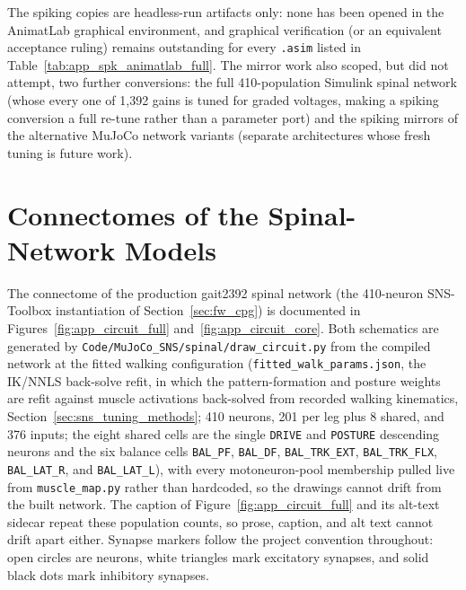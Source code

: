 The spiking copies are headless-run artifacts only: none has been opened in the AnimatLab graphical environment, and graphical verification (or an equivalent acceptance ruling) remains outstanding for every \texttt{.asim} listed in Table~\ref{tab:app_spk_animatlab_full}. The mirror work also scoped, but did not attempt, two further conversions: the full 410-population Simulink spinal network (whose every one of 1,392 gains is tuned for graded voltages, making a spiking conversion a full re-tune rather than a parameter port) and the spiking mirrors of the alternative MuJoCo network variants (separate architectures whose fresh tuning is future work).

\section{Connectomes of the Spinal-Network Models}\label{app:connectomes}

The connectome of the production gait2392 spinal network (the 410-neuron SNS-Toolbox instantiation of Section~\ref{sec:fw_cpg}) is documented in Figures~\ref{fig:app_circuit_full} and~\ref{fig:app_circuit_core}. Both schematics are generated by \texttt{Code/MuJoCo\_SNS/spinal/draw\_circuit.py} from the compiled network at the fitted walking configuration (\texttt{fitted\_walk\_params.json}, the IK/NNLS back-solve refit, in which the pattern-formation and posture weights are refit against muscle activations back-solved from recorded walking kinematics, Section~\ref{sec:sns_tuning_methods}; 410 neurons, 201 per leg plus 8 shared, and 376 inputs; the eight shared cells are the single \texttt{DRIVE} and \texttt{POSTURE} descending neurons and the six balance cells \texttt{BAL\_PF}, \texttt{BAL\_DF}, \texttt{BAL\_TRK\_EXT}, \texttt{BAL\_TRK\_FLX}, \texttt{BAL\_LAT\_R}, and \texttt{BAL\_LAT\_L}), with every motoneuron-pool membership pulled live from \texttt{muscle\_map.py} rather than hardcoded, so the drawings cannot drift from the built network. The caption of Figure~\ref{fig:app_circuit_full} and its alt-text sidecar repeat these population counts, so prose, caption, and alt text cannot drift apart either. Synapse markers follow the project convention throughout: open circles are neurons, white triangles mark excitatory synapses, and solid black dots mark inhibitory synapses.


